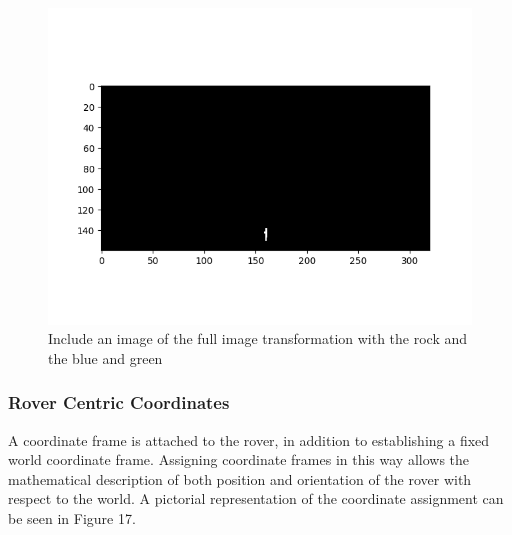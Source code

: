 \documentclass[a4paper]{article}
\begin{document}
\vspace{-1cm}

\begin{figure}[h]
\centering
\includegraphics[scale=0.55]{image17}
\vspace{-1cm}
\caption{Include an image of the full image transformation with the rock and the blue and green}
\end{figure}

\newpage

\subsubsection{Rover Centric Coordinates}
A coordinate frame is attached to the rover, in addition to establishing a fixed world coordinate frame. Assigning coordinate frames in this way allows the mathematical description of both position and orientation of the rover with respect to the world. A pictorial representation of the coordinate assignment can be seen in Figure 17.\\

\vspace{1cm}
\end{document}
